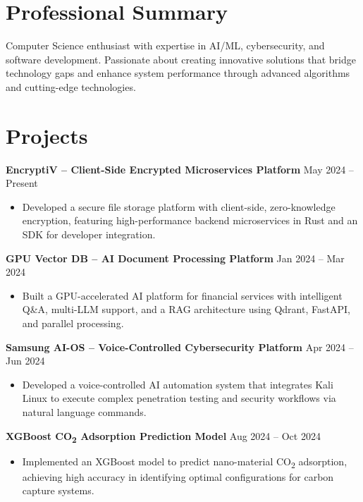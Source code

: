 \documentclass[10pt,a4paper]{article}
\begin{document}
\begin{minipage}[t]{0.65\textwidth}
    \sffamily 

    \section{Professional Summary}
    Computer Science enthusiast with expertise in AI/ML, cybersecurity, and software development. Passionate about creating innovative solutions that bridge technology gaps and enhance system performance through advanced algorithms and cutting-edge technologies.
    
    \section{Projects}
    \textbf{EncryptiV -- Client-Side Encrypted Microservices Platform} \hfill May 2024 -- Present
    \begin{itemize}
        \item Developed a secure file storage platform with client-side, zero-knowledge encryption, featuring high-performance backend microservices in Rust and an SDK for developer integration.
    \end{itemize}

    \textbf{GPU Vector DB -- AI Document Processing Platform} \hfill Jan 2024 – Mar 2024
    \begin{itemize}
        \item Built a GPU-accelerated AI platform for financial services with intelligent Q\&A, multi-LLM support, and a RAG architecture using Qdrant, FastAPI, and parallel processing.
    \end{itemize}
    
    \textbf{Samsung AI-OS -- Voice-Controlled Cybersecurity Platform} \hfill Apr 2024 – Jun 2024
    \begin{itemize}
        \item Developed a voice-controlled AI automation system that integrates Kali Linux to execute complex penetration testing and security workflows via natural language commands.
    \end{itemize}

    \textbf{XGBoost CO\textsubscript{2} Adsorption Prediction Model} \hfill Aug 2024 – Oct 2024
    \begin{itemize}
        \item Implemented an XGBoost model to predict nano-material CO\textsubscript{2} adsorption, achieving high accuracy in identifying optimal configurations for carbon capture systems.
    \end{itemize}


\end{minipage}
\end{document}
